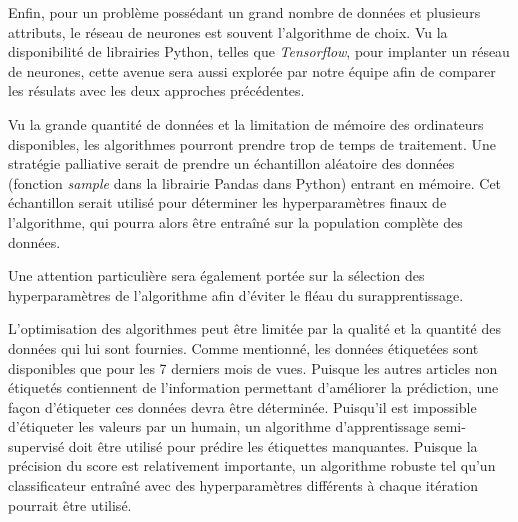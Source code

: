 \documentclass[french]{article}
\begin{document}
Enfin, pour un problème possédant un grand nombre de données et plusieurs attributs, le réseau de neurones est souvent l'algorithme de choix. Vu la disponibilité de librairies Python, telles que \emph{Tensorflow}, pour implanter un réseau de neurones, cette avenue sera aussi explorée par notre équipe afin de comparer les résulats avec les deux approches précédentes.



Vu la grande quantité de données et la limitation de mémoire des ordinateurs disponibles, les algorithmes pourront prendre trop de temps de traitement. Une stratégie palliative serait de prendre un échantillon aléatoire des données (fonction \emph{sample} dans la librairie Pandas dans Python) entrant en mémoire. Cet échantillon serait utilisé pour déterminer les hyperparamètres finaux de l'algorithme, qui pourra alors être entraîné sur la population complète des données.

Une attention particulière sera également portée sur la sélection des hyperparamètres de l'algorithme afin d'éviter le fléau du surapprentissage.

L'optimisation des algorithmes peut être limitée par la qualité et la quantité des données qui lui sont fournies. Comme mentionné, les données étiquetées sont disponibles que pour les 7 derniers mois de vues. Puisque les autres articles non étiquetés contiennent de l'information permettant d'améliorer la prédiction, une façon d'étiqueter ces données devra être déterminée. Puisqu'il est impossible d'étiqueter les valeurs par un humain, un algorithme d'apprentissage semi-supervisé doit être utilisé pour prédire les étiquettes manquantes. Puisque la précision du score est relativement importante, un algorithme robuste tel qu'un classificateur entraîné avec des hyperparamètres différents à chaque itération pourrait être utilisé. 


\end{document}
